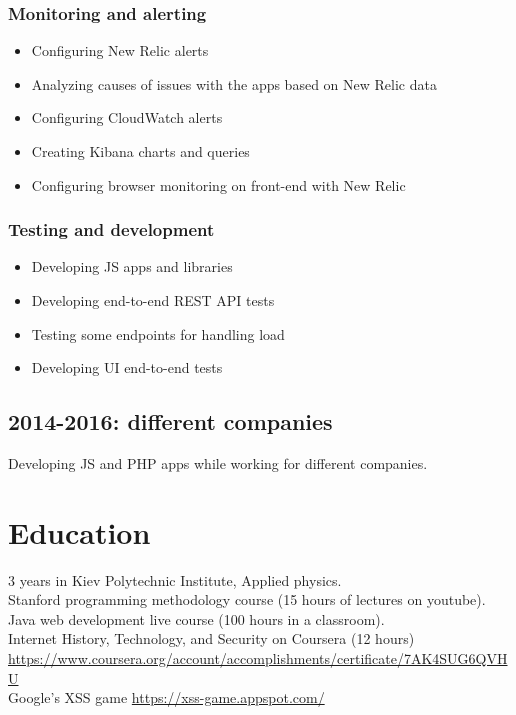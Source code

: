 \documentclass[a4paper, 14pt]{article}
\begin{document}
		\subsubsection{Monitoring and alerting}
			\begin{itemize}
				\item Configuring New Relic alerts \\
				\item Analyzing causes of issues with the apps based on New Relic data \\
				\item Configuring CloudWatch alerts \\
				\item Creating Kibana charts and queries \\
				\item Configuring browser monitoring on front-end with New Relic
			\end{itemize}

		\subsubsection{Testing and development}
			\begin{itemize}
				\item Developing JS apps and libraries \\
				\item Developing end-to-end REST API tests \\
				\item Testing some endpoints for handling load \\
				\item Developing UI end-to-end tests
			\end{itemize}

  \subsection{2014-2016: different companies}
    Developing JS and PHP apps while working for different companies.

\section{Education}
	3 years in Kiev Polytechnic Institute, Applied physics. \\
	Stanford programming methodology course (15 hours of lectures on youtube). \\
	Java web development live course (100 hours in a classroom). \\
  Internet History, Technology, and Security on Coursera (12 hours) \url{https://www.coursera.org/account/accomplishments/certificate/7AK4SUG6QVHU} \\
  Google's XSS game \url{https://xss-game.appspot.com/}
\end{document}
